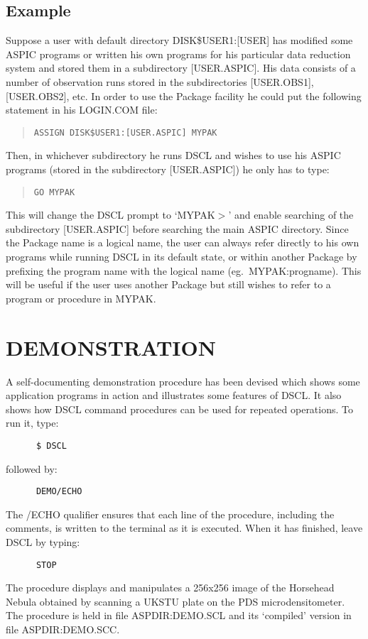 \subsection {Example}
Suppose a user with default directory DISK\$USER1:[USER] has modified some
ASPIC programs or written his own programs for his particular data reduction
system and stored them in a subdirectory [USER.\-ASPIC].
His data consists of a number of observation runs stored in the subdirectories
[USER.OBS1], [USER.OBS2], etc.
In order to use the Package facility he could put the following statement in
his LOGIN.COM file:
\begin{quote}
{\tt ASSIGN DISK\$USER1:[USER.ASPIC] MYPAK}
\end{quote}
Then, in whichever subdirectory he runs DSCL and wishes to use his ASPIC
programs (stored in the subdirectory [USER.\-ASPIC]) he only has to type:
\begin{quote}
{\tt GO MYPAK}
\end{quote}
This will change the DSCL prompt to `MYPAK$>$' and enable searching of the
subdirectory [USER.\-ASPIC] before searching the main ASPIC directory.
Since the Package name is a logical name, the user can always refer
directly to his own programs while running DSCL in its default state, or within
another Package by prefixing the program name with the logical name (eg.\
MYPAK:progname).
This will be useful if the user uses another Package but still wishes to refer
to a program or procedure in MYPAK.

\section {DEMONSTRATION}

A self-documenting demonstration procedure has been devised which shows some
application programs in action and illustrates some features of DSCL.
It also shows how DSCL command procedures can be used for repeated operations.
To run it, type:
\begin{verbatim}
      $ DSCL
\end{verbatim}
followed by:
\begin{verbatim}
      DEMO/ECHO
\end{verbatim}
The /ECHO qualifier ensures that each line of the procedure, including the
comments, is written to the terminal as it is executed.
When it has finished, leave DSCL by typing:
\begin{verbatim}
      STOP
\end{verbatim}
The procedure displays and manipulates a 256x256 image of the Horsehead Nebula
obtained by scanning a UKSTU plate on the PDS microdensitometer.
The procedure is held in file ASPDIR:\-DEMO.\-SCL and its `compiled' version
in file ASPDIR:DEMO.SCC.

